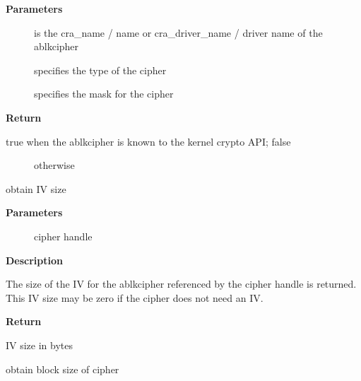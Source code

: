 \documentclass[a4paper,8pt,english]{sphinxmanual}
\begin{document}
\textbf{Parameters}
\begin{description}
\item[{}] \leavevmode
is the cra\_name / name or cra\_driver\_name / driver name of the
ablkcipher

\item[{}] \leavevmode
specifies the type of the cipher

\item[{}] \leavevmode
specifies the mask for the cipher

\end{description}

\textbf{Return}
\begin{description}
\item[{true when the ablkcipher is known to the kernel crypto API; false}] \leavevmode
otherwise

\end{description}

\begin{fulllineitems}
\label{crypto/api-skcipher:c.crypto_ablkcipher_ivsize}
obtain IV size

\end{fulllineitems}


\textbf{Parameters}
\begin{description}
\item[{}] \leavevmode
cipher handle

\end{description}

\textbf{Description}

The size of the IV for the ablkcipher referenced by the cipher handle is
returned. This IV size may be zero if the cipher does not need an IV.

\textbf{Return}

IV size in bytes

\begin{fulllineitems}
\label{crypto/api-skcipher:c.crypto_ablkcipher_blocksize}
obtain block size of cipher

\end{fulllineitems}
\end{document}
